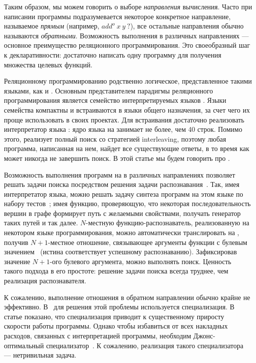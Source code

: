 \documentclass[conference]{IEEEtran}
\begin{document}
Таким образом, мы можем говорить о выборе \emph{направления} вычисления. 
Часто при написании программы подразумевается некоторое конкретное направление, называемое \emph{прямым} (например, $add^o  \ x \ y \ ?$), все остальные направления обычно называются \emph{обратными}. 
Возможность выполнения в различных направлениях --- основное преимущество реляционного программирования. 
Это своеобразный шаг к декларативности: достаточно написать одну программу для получения множества целевых функций. 

Реляционному программированию родственно логическое, представленное такими языками, как \prolog{} и \mercury{}.
Основным представителем парадигмы реляционного программирования является семейство интерпретируемых языков \miniKanren{}. 
Языки семейства \miniKanren{} компактны и встраиваются в языки общего назначения, за счет чего их проще использовать в своих проектах. 
Для встраивания достаточно реализовать интерпретатор языка \miniKanren{}: ядро языка на \scheme{} занимает не более, чем 40 строк. 
Помимо этого, \miniKanren{} реализует полный поиск со стратегией interleaving, поэтому любая программа, написанная на нем, найдет все существующие ответы, в то время как \prolog{} может никогда не завершить поиск. 
В этой статье мы будем говорить про \miniKanren{}.

Возможность выполнения программ на \miniKanren{} в различных направлениях позволяет решать задачи поиска посредством решения задачи распознавания~\cite{lozov2019relational}.
Так, имея интерпретатор языка, можно решать задачу синтеза программ на этом языке по набору тестов~\cite{byrd2017unified}; имея функцию, проверяющую, что некоторая последовательность вершин в графе формирует путь с желаемыми свойствами, получать генератор таких путей и так далее. 
$N$-местную функцию-распознаватель, реализованную на некотором языке программирования, можно автоматически транслировать на \miniKanren{}, получив $N+1$-местное отношение, связывающее аргументы функции с булевым значением~\cite{lozov2019relational} (истина соответствует успешному распознаванию). 
Зафиксировав значение $N+1$-ого булевого аргумента, можно выполнять поиск. 
Ценность такого подхода в его простоте: решение задачи поиска всегда труднее, чем реализация распознавателя. 

К сожалению, выполнение отношения в обратном направлении обычно крайне не эффективно. 
В~\cite{lozov2019relational} для решения этой проблемы используется специализация. 
В статье показано, что специализация приводит к существенному приросту скорости работы программы.
Однако чтобы избавиться от всех накладных расходов, связанных с интерпретацией программы, необходим Джонс-оптимальный специализатор~\cite{jones1993partial}. 
К сожалению, реализация такого специализатора --- нетривильная задача.
\end{document}
